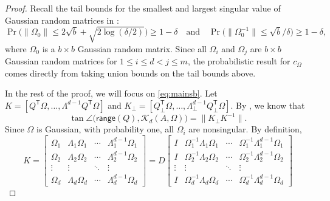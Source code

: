 \documentclass{article}
\newcommand{\Ttran}{\mathsf{T}}
\newcommand{\range}{\mathsf{range}}
\providecommand{\norm}[1]{\lVert#1\rVert}
\begin{document}
\begin{proof}
    Recall the tail bounds for the smallest and largest singular value of Gaussian random matrices in \cite[Thm.~2.6 and Thm.~3.1]{Rudelson2010}:
    \begin{equation*}
        \Pr\bigl(\norm{\Omega_{0}}\leq 2\sqrt{b}+\sqrt{2\log(\delta/2)}\bigr) \geq 1-\delta\quad\text{and}\quad \Pr\bigl(\norm{\Omega_{0}^{-1}}\leq \sqrt{b}/\delta\bigr) \geq 1-\delta,
    \end{equation*}
    where $\Omega_{0}$ is a $b\times b$ Gaussian random matrix.
    Since all $\Omega_{i}$ and $\Omega_{j}$ are $b\times b$ Gaussian random matrices for $1\leq i\leq d<j\leq m$, the probabilistic result for $c_{\Omega}$ comes directly from taking union bounds on the tail bounds above.
    
    In the rest of the proof, we will focus on \cref{eq:mainsb}. Let $
    K = [Q^{\Ttran}\Omega,\dotsc,\Lambda^{d-1} Q^{\Ttran}\Omega]$ and $
    K_{\perp} = [Q_{\perp}^{\Ttran}\Omega,\dotsc,\Lambda_{\perp}^{d-1} Q_{\perp}^{\Ttran}\Omega]$.
    By \cite[Thm.~3.1]{Zhu2013}, we know that 
\begin{equation}
    \label{eq:pfthmmain1}
    \tan\angle\bigl(\range(Q),\mathcal{K}_{d}(A,\Omega)\bigr) = \norm{K_{\perp}K^{-1}}.
\end{equation} 
Since $\Omega$ is Gaussian, with probability one, all $\Omega_{i}$ are nonsingular.
By definition,  
\begin{equation*}
    K = \begin{bmatrix}
        \Omega_{1} & \Lambda_{1}\Omega_{1} & \cdots & \Lambda_{1}^{d-1}\Omega_{1}\\ 
        \Omega_{2} & \Lambda_{2}\Omega_{2} & \cdots & \Lambda_{2}^{d-1}\Omega_{2}\\ 
        \vdots & \vdots & \ddots & \vdots \\ 
        \Omega_{d} & \Lambda_{d}\Omega_{d} & \cdots & \Lambda_{d}^{d-1}\Omega_{d}
    \end{bmatrix}
    = D
    \begin{bmatrix}
        I & \Omega_{1}^{-1}\Lambda_{1}\Omega_{1} & \cdots & \Omega_{1}^{-1}\Lambda_{1}^{d-1}\Omega_{1}\\ 
        I & \Omega_{2}^{-1}\Lambda_{2}\Omega_{2} & \cdots & \Omega_{2}^{-1}\Lambda_{2}^{d-1}\Omega_{2}\\ 
        \vdots & \vdots & \ddots & \vdots \\ 
        I & \Omega_{d}^{-1}\Lambda_{d}\Omega_{d} & \cdots & \Omega_{d}^{-1}\Lambda_{d}^{d-1}\Omega_{d}

\end{bmatrix}
\end{equation*}
\end{proof}
\end{document}
